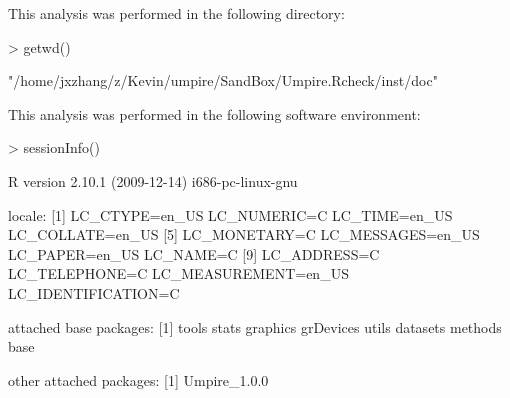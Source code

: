 \documentclass[11pt]{article}
\begin{document}
This analysis was performed in the following directory:
\begin{Schunk}
\begin{Sinput}
> getwd()
\end{Sinput}
\begin{Soutput}
[1] "/home/jxzhang/z/Kevin/umpire/SandBox/Umpire.Rcheck/inst/doc"
\end{Soutput}
\end{Schunk}
This analysis was performed in the following software environment:
\begin{Schunk}
\begin{Sinput}
> sessionInfo()
\end{Sinput}
\begin{Soutput}
R version 2.10.1 (2009-12-14) 
i686-pc-linux-gnu 

locale:
 [1] LC_CTYPE=en_US       LC_NUMERIC=C         LC_TIME=en_US        LC_COLLATE=en_US    
 [5] LC_MONETARY=C        LC_MESSAGES=en_US    LC_PAPER=en_US       LC_NAME=C           
 [9] LC_ADDRESS=C         LC_TELEPHONE=C       LC_MEASUREMENT=en_US LC_IDENTIFICATION=C 

attached base packages:
[1] tools     stats     graphics  grDevices utils     datasets  methods   base     

other attached packages:
[1] Umpire_1.0.0
\end{Soutput}
\end{Schunk}
\end{document}

